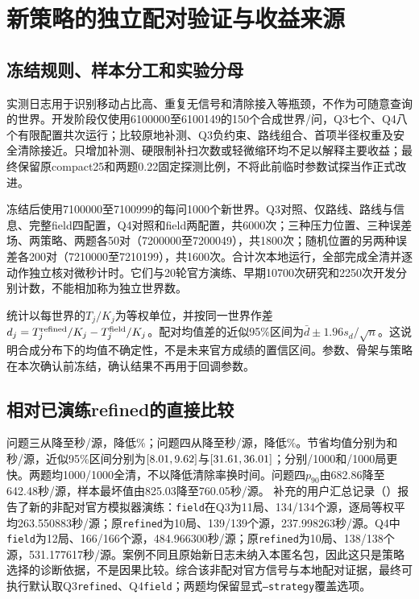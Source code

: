 \section{新策略的独立配对验证与收益来源}
\label{field:sec-results}
\subsection{冻结规则、样本分工和实验分母}
实测日志用于识别移动占比高、重复无信号和清除接入等瓶颈，不作为可随意查询的世界。开发阶段仅使用6100000至6100149的150个合成世界/问，Q3七个、Q4八个有限配置共\FieldDevelopmentRuns{}次运行；比较原地补测、Q3负约束、路线组合、首项半径权重及安全清除接近。只增加补测、硬限制补扫次数或轻微缩环均不足以解释主要收益；最终保留原compact25和两题0.22固定探测比例，不将此前临时参数试探当作正式改进。

冻结后使用7100000至7100999的每问1000个新世界。Q3对照、仅路线、路线与信息、完整field四配置，Q4对照和field两配置，共6000次；三种压力位置、三种误差场、两策略、两题各50对（7200000至7200049），共1800次；随机位置的另两种误差各200对（7210000至7210199），共1600次。合计\FieldRuns{}次本地运行，全部完成全清并逐动作独立核对微秒计时。它们与20轮官方演练、早期10700次研究和2250次开发分别计数，不能相加称为独立世界数。

统计以每世界的$T_j/K_j$为等权单位，并按同一世界作差$d_j=T_j^{\rm refined}/K_j-T_j^{\rm field}/K_j$。配对均值差的近似95\%区间为$\bar d\pm1.96s_d/\sqrt n$。这说明合成分布下的均值不确定性，不是未来官方成绩的置信区间。参数、骨架与策略在本次确认前冻结，确认结果不再用于回调参数。

\subsection{相对已演练refined的直接比较}
\begin{table}[H]\centering\small
\caption{每问1000个新合成世界的配对结果，单位秒/源；不是官方反事实成绩}
\label{field:tab-main}

\end{table}
问题三从\FieldQThreeControl{}降至\FieldQThreeTime{}秒/源，降低\FieldQThreeGain\%；问题四从\FieldQFourControl{}降至\FieldQFourTime{}秒/源，降低\FieldQFourGain\%。节省均值分别为\FieldQThreeSaved{}和\FieldQFourSaved{}秒/源，近似95\%区间分别为$[8.01,9.62]$与$[31.61,36.01]$；分别\FieldQThreeFaster/1000和\FieldQFourFaster/1000局更快。两题均1000/1000全清，不以降低清除率换时间。问题四$p_{90}$由682.86降至642.48秒/源，样本最坏值由825.03降至760.05秒/源。
补充的用户汇总记录（）报告了新的非配对官方模拟器演练：\texttt{field}在Q3为11局、134/134个源，逐局等权平均263.550883秒/源；原\texttt{refined}为10局、139/139个源，237.998263秒/源。Q4中\texttt{field}为12局、166/166个源，484.966300秒/源；原\texttt{refined}为10局、138/138个源，531.177617秒/源。案例不同且原始新日志未纳入本匿名包，因此这只是策略选择的诊断依据，不是因果比较。综合该非配对官方信号与本地配对证据，最终可执行默认取Q3\texttt{refined}、Q4\texttt{field}；两题均保留显式\texttt{--strategy}覆盖选项。

